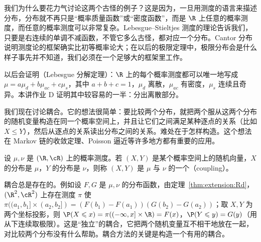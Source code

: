 \begin{remark}
我们为什么要花力气讨论这两个古怪的例子？这是因为，一旦用测度的语言来描述分布，分布就不再只是“概率质量函数”或“密度函数”，而是 $\R$ 上任意的概率测度，而任意的概率测度可以非常复杂。Lebesgue--Stieltjes 测度的理论告诉我们，只要是右连续的单调不减函数，不管它多么古怪，都对应一个分布。Cantor 分布说明测度论的框架确实比初等概率论大；在以后的极限定理中，极限分布会是什么样子事先并不知道，我们必须在一个足够大的框架里工作。
\end{remark}

\begin{remark}
以后会证明（Lebesgue 分解定理）：$\R$ 上的每个概率测度都可以唯一地写成 $\mu=a\mu_d+b\mu_{ac}+c\mu_s$，其中 $a+b+c=1$，$\mu_d$ 离散，$\mu_{ac}$ 有密度，$\mu_s$ 连续且奇异。本讲作业 D 证明其中较容易的一半：分出离散部分。
\end{remark}


我们现在讨论耦合。它的想法很简单：要比较两个分布，就把两个服从这两个分布的随机变量构造在同一个概率空间上，并且让它们之间满足某种逐点的关系（比如 $X\leqslant Y$），然后从逐点的关系读出分布之间的关系。难处在于怎样构造。这个想法在 Markov 链的收敛定理、Poisson 逼近等许多地方都有重要的应用。

\begin{definition}[耦合]\label{def:distributions:coupling}
设 $\mu,\nu$ 是 $(\R,\cR)$ 上的概率测度。若 $(X,Y)$ 是某个概率空间上的随机向量，$X$ 的分布是 $\mu$，$Y$ 的分布是 $\nu$，则称 $(X,Y)$ 是 $\mu$ 与 $\nu$ 的一个（coupling）。
\end{definition}

耦合总是存在的。例如设 $F,G$ 是 $\mu,\nu$ 的分布函数，由定理~\ref{thm:extension:Rd}，$(\R^2,\cR^2)$ 上存在测度 $\pi$ 使 $\pi((a_1,b_1]\times(a_2,b_2])=(F(b_1)-F(a_1))(G(b_2)-G(a_2))$；取 $X,Y$ 为两个坐标投影，则 $\P(X\leqslant x)=\pi((-\infty,x]\times\R)=F(x)$，$\P(Y\leqslant y)=G(y)$（用从下连续取极限）。这是“独立”的耦合，它把两个随机变量互不相干地放在一起，对比较两个分布没有什么帮助。耦合方法的关键是构造一个有用的耦合。

